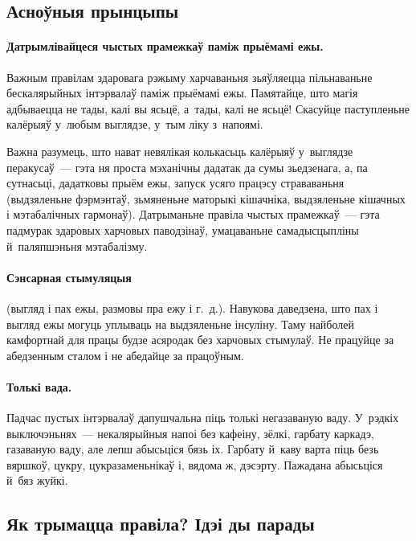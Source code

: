 \subsection{Асноўныя прынцыпы}

\paragraph{Датрымлівайцеся чыстых прамежкаў паміж прыёмамі ежы.}

Важным правілам здаровага рэжыму харчаваньня зьяўляецца пільнаваньне бескалярыйных інтэрвалаў паміж прыёмамі ежы. Памятайце, што магія адбываецца не тады, калі вы ясьцё, а~тады, калі не ясьцё! Скасуйце паступленьне калёрыяў у~любым выглядзе, у~тым ліку з~напоямі.

Важна разумець, што нават невялікая колькасьць калёрыяў у~выглядзе перакусаў~--- гэта ня проста мэханічны дадатак да сумы зьедзенага, а, па сутнасьці, дадатковы прыём ежы, запуск усяго працэсу страваваньня (выдзяленьне фэрмэнтаў, зьмяненьне маторыкі кішачніка, выдзяленьне кішачных і мэтабалічных гармонаў). Датрыманьне правіла чыстых прамежкаў~--- гэта падмурак здаровых харчовых паводзінаў, умацаваньне самадысцыпліны й~паляпшэньня мэтабалізму.

\paragraph{Сэнсарная стымуляцыя} (выгляд і пах ежы, размовы пра ежу і г.~д.). Навукова даведзена, што пах і выгляд ежы могуць уплываць на выдзяленьне інсуліну. Таму найболей камфортнай для працы будзе асяродак без харчовых стымулаў. Не працуйце за абедзенным сталом і не абедайце за працоўным.

\paragraph{Толькі вада.}

Падчас пустых інтэрвалаў дапушчальна піць толькі негазаваную ваду. У~рэдкіх выключэньнях~--- некалярыйныя напоі без кафеіну, зёлкі, гарбату каркадэ, газаваную ваду, але лепш абысьціся бязь іх. Гарбату й~каву варта піць безь вяршкоў, цукру, цукразаменьнікаў і, вядома ж, дэсэрту. Пажадана абысьціся й~бяз жуйкі.

\subsection{Як трымацца правіла? Ідэі ды парады}

